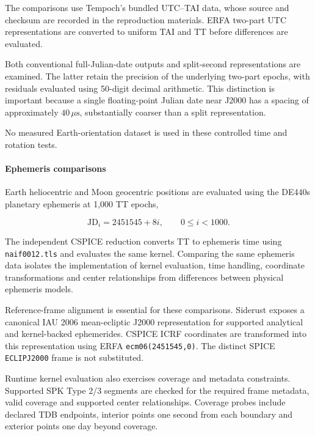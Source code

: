 The comparisons use Tempoch's bundled UTC--TAI data, whose source and checksum are recorded in the
reproduction materials. ERFA two-part UTC representations are converted to uniform TAI and TT
before differences are evaluated.

Both conventional full-Julian-date outputs and split-second representations are examined. The
latter retain the precision of the underlying two-part epochs, with residuals evaluated using
50-digit decimal arithmetic. This distinction is important because a single floating-point Julian
date near J2000 has a spacing of approximately $40\,\mu\mathrm{s}$, substantially coarser than a
split representation.

No measured Earth-orientation dataset is used in these controlled time and rotation tests.

\paragraph{Ephemeris comparisons}

Earth heliocentric and Moon geocentric positions are evaluated using the DE440s planetary ephemeris
\cite{park2021de440,naifspk} at 1,000 TT epochs,

\begin{equation}
    \mathrm{JD}_i = 2451545+8i,
    \qquad 0\leq i<1000.
\end{equation}

The independent CSPICE reduction converts TT to ephemeris time using \texttt{naif0012.tls} and
evaluates the same kernel. Comparing the same ephemeris data isolates the implementation of kernel
evaluation, time handling, coordinate transformations and center relationships from differences
between physical ephemeris models.

Reference-frame alignment is essential for these comparisons. Siderust exposes a canonical IAU 2006
mean-ecliptic J2000 representation for supported analytical and kernel-backed ephemerides. CSPICE
ICRF coordinates are transformed into this representation using ERFA \texttt{ecm06(2451545,0)}. The
distinct SPICE \texttt{ECLIPJ2000} frame is not substituted.

Runtime kernel evaluation also exercises coverage and metadata constraints. Supported SPK Type 2/3
segments are checked for the required frame metadata, valid coverage and supported center
relationships. Coverage probes include declared TDB endpoints, interior points one second from each
boundary and exterior points one day beyond coverage.

